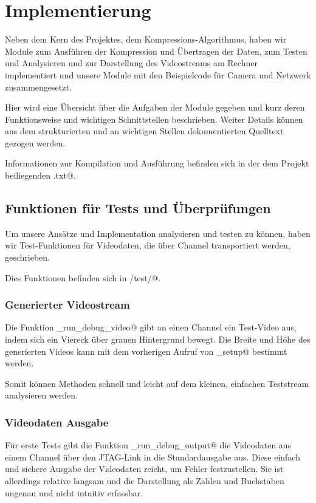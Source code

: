 
\chapter{Implementierung}

Neben dem Kern des Projektes, dem Kompressions-Algorithmus, 
haben wir Module zum Ausführen der Kompression und Übertragen der Daten,
zum Testen und Analysieren und zur Darstellung des Videostreams am Rechner
implementiert und unsere Module mit den Beispielcode für Camera und Netzwerk
zusammengesetzt.

Hier wird eine Übersicht über die Aufgaben der Module gegeben und 
kurz deren Funktionsweise und wichtigen Schnittstellen beschrieben.
Weiter Details können aus dem strukturierten und an wichtigen Stellen
dokumentierten Quelltext gezogen werden.

Informationen zur Kompilation und Ausführung befinden sich in der dem 
Projekt beiliegenden \verb@README.txt@.

\section{Funktionen für Tests und Überprüfungen}
Um unsere Ansätze und Implementation analysieren und testen zu können,
haben wir Test-Funktionen für Videodaten, die über Channel transportiert
werden, geschrieben.

Dies Funktionen befinden sich in \verb@board/test/@.

\subsection{Generierter Videostream}
Die Funktion \lstinline@tst_run_debug_video@ gibt an einen Channel ein Test-Video aus,
indem sich ein Viereck über grauen Hintergrund bewegt.
Die Breite und Höhe des generierten Videos kann mit dem vorherigen Aufruf von
\lstinline@tst_setup@ bestimmt werden. 

Somit können Methoden schnell und leicht auf dem kleinen, einfachen
Teststream analysieren werden.

\subsection{Videodaten Ausgabe}
Für erste Tests gibt die Funktion \lstinline@tst_run_debug_output@ die
Videodaten aus einem Channel über den JTAG-Link in die Standardausgabe aus.
Diese einfach und sichere Ausgabe der Videodaten reicht, um Fehler
festzustellen. 
Sie ist allerdings relative langsam und die Darstellung als Zahlen und Buchstaben
ungenau und nicht intuitiv erfassbar.

